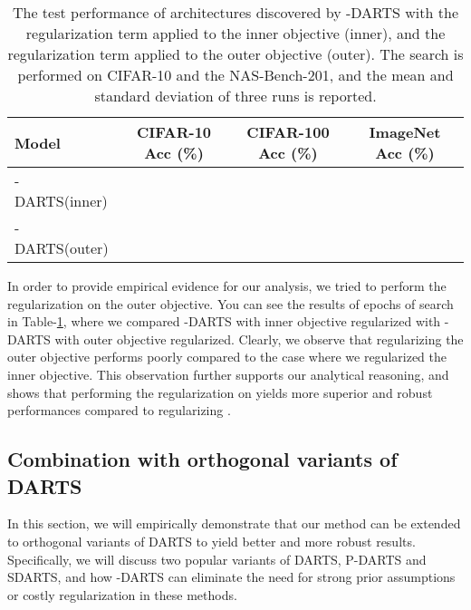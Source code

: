 \documentclass{article} \usepackage{fancyhdr, iclr2023_conference, times}
\newcommand{\mydarts}{-DARTS\xspace}
\begin{document}
\par \begin{table}[t]
\centering
\caption{The test performance of architectures discovered by \mydarts with the regularization term applied to the inner objective (inner), and the regularization term applied to the outer objective (outer). The search is performed on CIFAR-10 and the NAS-Bench-201, and the mean and standard deviation of three runs is reported.} 
\label{table:outer-inner}
\begin{tabular}{l|c|c|c}
\textbf{Model} &\textbf{CIFAR-10 Acc (\%)} & \textbf{CIFAR-100 Acc (\%)} & \textbf{ImageNet Acc (\%)}\\ \hline
    \mydarts (inner) &  &  & \\
    \mydarts (outer) &  &  & \\
\end{tabular}
\end{table}In order to provide empirical evidence for our analysis, we tried to perform the regularization on the outer objective. You can see the results of  epochs of search in Table-\ref{table:outer-inner}, where we compared \mydarts with inner objective regularized with \mydarts with outer objective regularized. Clearly, we observe that regularizing the outer objective performs poorly compared to the case where we regularized the inner objective. This observation further supports our analytical reasoning, and shows that performing the regularization on  yields more superior and robust performances compared to regularizing .
\subsection{Combination with orthogonal variants of DARTS}
\label{appndx:orthogonal-vars}
\par In this section, we will empirically demonstrate that our method can be extended to orthogonal variants of DARTS to yield better and more robust results. Specifically, we will discuss two popular variants of DARTS, P-DARTS and SDARTS, and how \mydarts can eliminate the need for strong prior assumptions or costly regularization in these methods.
\end{document}
